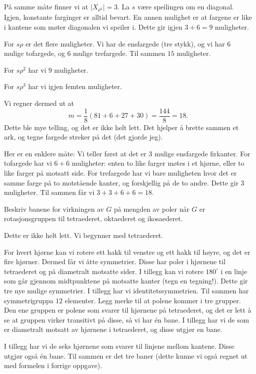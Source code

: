 \documentclass[11pt, norsk]{article}
\begin{document}
\begin{losn}
\begin{enumerate}[a)]
På samme måte finner vi at $\lvert X_{\rho^3} \rvert = 3$. La $s$ være speilingen om en diagonal. Igjen, konstante farginger er alltid bevart. En annen mulighet er at fargene er like i kantene som møter diagonalen vi speiler i. Dette gir igjen $3+6=9$ muligheter.

For $s\rho$ er det flere muligheter. Vi har de ensfargede (tre stykk), og vi har $6$ mulige tofargede, og $6$ mulige trefargede. Til sammen $15$ muligheter.

For $s\rho^2$ har vi $9$ muligheter.

For $s \rho^3$ har vi igjen femten muligheter.

Vi regner dermed ut at 
\[
m = \frac{1}{8} \left( 81+6 + 27+30\right) = \frac{144}{8} = 18.
\]
Dette ble mye telling, og det er ikke helt lett. Det hjelper å brette sammen et ark, og tegne fargede streker på det (det gjorde jeg).

Her er en enklere måte: Vi teller først at det er $3$ mulige ensfargede firkanter. For tofargede har vi $6+6$ muligheter: enten to like farger møtes i et hjørne, eller to like farger på motsatt side. For trefargede har vi bare muligheten hvor det er samme farge på to motstående kanter, og forskjellig på de to andre. Dette gir $3$ muligheter. Til sammen får vi $3+3+6+6=18$. 
  \end{enumerate}
\end{losn}

\begin{oppg}
Beskriv banene for virkningen av $G$ på mengden av poler når $G$ er rotasjonsgruppen til tetraederet, oktaederet og ikosaederet.
\end{oppg}

\begin{losn}
Dette er ikke helt lett. Vi begynner med tetraederet.

For hvert hjørne kan vi rotere ett hakk til venstre og ett hakk til høyre, og det er fire hjørner. Dermed får vi åtte symmetrier. Disse har poler i hjørnene til tetraederet og på diametralt motsatte sider. I tillegg kan vi rotere $180^\circ$ i en linje som går gjennom midtpunktene på motsatte kanter (tegn en tegning!). Dette gir tre nye mulige symmetrier. I tillegg har vi identitetssymmetrien. Til sammen har symmetrigruppa $12$ elementer. Legg merke til at polene kommer i tre grupper. Den ene gruppen er polene som svarer til hjørnene på tetraederet, og det er lett å se at gruppen virker transitivt på disse, så vi har én bane. I tillegg har vi de som er diametralt motsatt av hjørnene i tetraederet, og disse utgjør en bane. 

I tillegg har vi de seks hjørnene som svarer til linjene mellom kantene. Disse utgjør også én bane. Til sammen er det tre baner (dette kunne vi også regnet ut med formelen i forrige oppgave).
\end{losn}
\end{document}
